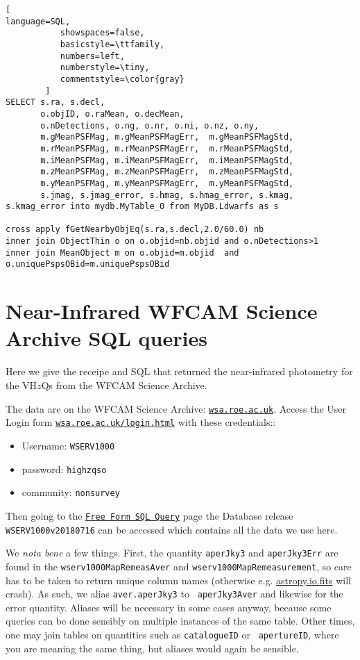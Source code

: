 \documentclass[usenatbib]{mnras}
\begin{document}
\onecolumn
\begin{lstlisting}[
language=SQL,
           showspaces=false,
           basicstyle=\ttfamily,
           numbers=left,
           numberstyle=\tiny,
           commentstyle=\color{gray}
        ]
SELECT s.ra, s.decl, 
       o.objID, o.raMean, o.decMean, 
       o.nDetections, o.ng, o.nr, o.ni, o.nz, o.ny, 
       m.gMeanPSFMag, m.gMeanPSFMagErr,  m.gMeanPSFMagStd, 
       m.rMeanPSFMag, m.rMeanPSFMagErr,  m.rMeanPSFMagStd, 
       m.iMeanPSFMag, m.iMeanPSFMagErr,  m.iMeanPSFMagStd, 
       m.zMeanPSFMag, m.zMeanPSFMagErr,  m.zMeanPSFMagStd, 
       m.yMeanPSFMag, m.yMeanPSFMagErr,  m.yMeanPSFMagStd, 
       s.jmag, s.jmag_error, s.hmag, s.hmag_error, s.kmag, s.kmag_error into mydb.MyTable_0 from MyDB.Ldwarfs as s

cross apply fGetNearbyObjEq(s.ra,s.decl,2.0/60.0) nb
inner join ObjectThin o on o.objid=nb.objid and o.nDetections>1 
inner join MeanObject m on o.objid=m.objid  and o.uniquePspsOBid=m.uniquePspsOBid
\end{lstlisting}
\twocolumn


\section{Near-Infrared WFCAM Science Archive SQL queries}\label{sec:SQL}
Here we give the receipe and SQL that returned the near-infrared photometry 
for the VH$z$Qs from the  WFCAM Science Archive. 

The data are on the WFCAM Science Archive: \href{wsa.roe.ac.uk}{\tt wsa.roe.ac.uk}. 
Access the User Login form \href{WFCAM Science Archive}{\tt wsa.roe.ac.uk/login.html} 
with these credentials::
\begin{itemize}
    \item Username: {\tt WSERV1000} 
    \item password: {\tt highzqso} 
    \item community: {\tt nonsurvey}
\end{itemize}
Then going to the
\href{http://wsa.roe.ac.uk:8080/wsa/SQL_form.jsp}{{\tt Free Form SQL
Query}} page the Database release {\tt WSERV1000v20180716} can be
accessed which contains all the data we use here.

We {\it nota bene} a few things. First, the quantity {\tt aperJky3}
and {\tt aperJky3Err} are found in the {\tt wserv1000MapRemeasAver}
and {\tt wserv1000MapRemeasurement}, so care has to be taken to return
unique column names (otherwise e.g.
\href{http://docs.astropy.org/en/stable/io/fits/}{astropy.io.fits}
will crash).  As such, we alias {\tt aver.aperJky3} to {\tt
aperJky3Aver} and likewise for the error quantity. Aliases will be
necessary in some cases anyway, because some queries can be done
sensibly on multiple instances of the same table. Other times, one may
join tables on quantities such as {\tt catalogueID} or {\tt
apertureID}, where you are meaning the same thing, but aliases would
again be sensible.
\end{document}
